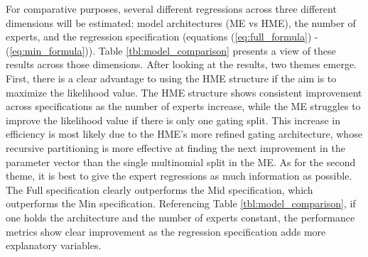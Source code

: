 \documentclass[12pt]{article}
\begin{document}
For comparative purposes, several different regressions across three
different dimensions will be estimated: model architectures (ME vs HME), the number of experts,
and the regression specification (equations (\ref{eq:full_formula}) -
(\ref{eq:min_formula})). Table \ref{tbl:model_comparison} presents a view of these
results across those dimensions. After looking at the results,
two themes emerge. First, there is a clear advantage to using the HME structure
if the aim is to maximize the likelihood value. The HME structure shows consistent
improvement across specifications as the number of experts increase, while the ME
struggles to improve the likelihood value if there is only one gating split.
This increase in efficiency is most likely due
to the HME's more refined gating architecture, whose recursive partitioning is more
effective at finding the next improvement in the parameter vector than the single
multinomial split in the ME. As for the second theme, it is best to give the expert
regressions as much information as possible. The Full specification clearly outperforms
the Mid specification, which outperforms the Min specification. Referencing Table
\ref{tbl:model_comparison}, if one holds the architecture and the number of experts
constant, the performance metrics show clear improvement as the regression specification
adds more explanatory variables.
\end{document}
